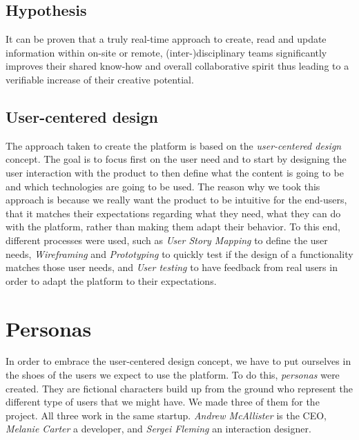 \documentclass[a4paper,12pt, oneside]{article}
\begin{document}
\subsection{Hypothesis}
\label{hypothesis}
It can be proven that a truly real-time approach to create, read and update information within on-site or remote, (inter-)disciplinary teams significantly improves their shared know-how and overall collaborative spirit thus leading to a verifiable increase of their creative potential.

\subsection{User-centered design}
The approach taken to create the platform is based on the \emph{user-centered design} concept.
The goal is to focus first on the user need and to start by designing the user interaction with the product to then define what the content is going to be and which technologies are going to be used.
The reason why we took this approach is because we really want the product to be intuitive for the end-users, that it matches their expectations regarding what they need, what they can do with the platform, rather than making them adapt their behavior.
To this end, different processes were used, such as \emph{User Story Mapping} to define the user needs, \emph{Wireframing} and \emph{Prototyping} to quickly test if the design of a functionality matches those user needs, and \emph{User testing} to have feedback from real users in order to adapt the platform to their expectations.

\section{Personas}
In order to embrace the user-centered design concept, we have to put ourselves in the shoes of the users we expect to use the platform. To do this, \emph{personas} were created. They are fictional characters build up from the ground who represent the different type of users that we might have. We made three of them for the project. All three work in the same startup. \emph{Andrew McAllister} is the CEO, \emph{Melanie Carter} a developer, and \emph{Sergei Fleming} an interaction designer.

\end{document}
